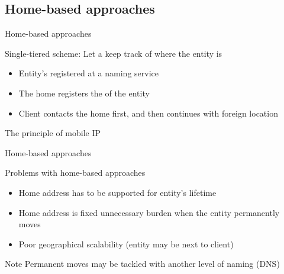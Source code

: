 \subsection{Home-based approaches}
\begin{slide}{Home-based approaches}
  \begin{block}{Single-tiered scheme: Let a  keep track of where the entity is}
    \begin{itemize}\tightlist
    \item Entity's  registered at a naming service
    \item The home registers the  of the entity
    \item Client contacts the home first, and then continues with foreign location
    \end{itemize}
  \end{block}
\end{slide}
\begin{slide}{The principle of mobile IP}
  \begin{center}
  \end{center}
\end{slide}
\begin{slide}{Home-based approaches}
  \begin{block}{Problems with home-based approaches}
    \begin{itemize}
    \item Home address has to be supported for entity's lifetime
    \item Home address is fixed \mathexpr{\Rightarrow} unnecessary burden when the entity permanently moves
    \item Poor geographical scalability (entity may be next to client)
    \end{itemize}
  \end{block}
  \begin{alertblock}{Note}
    Permanent moves may be tackled with another level of naming (DNS)
  \end{alertblock}
\end{slide}
